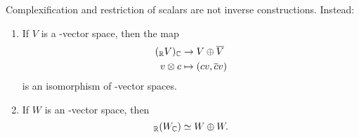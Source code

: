 \documentclass{scrartcl}
\begin{document}
Complexification and restriction of scalars are not inverse constructions. Instead:
\begin{proposition}
    \hfill
    \begin{enumerate}[font=\normalfont]
        \item If $V$ is a \CC-vector space, then the map \begin{align*}
            (_{\mathbb R} V)_{\mathbb C} &\rightarrow V \oplus \overline{V} \\
            v\otimes c &\mapsto (cv,\overline{c}v) \\
        \end{align*} is an isomorphism of \CC-vector spaces.
        \item If $W$ is an \RR-vector space, then \[_{\mathbb R}(W_{\mathbb C}) \simeq W\oplus W.\]
    \end{enumerate}
\end{proposition}
\end{document}
